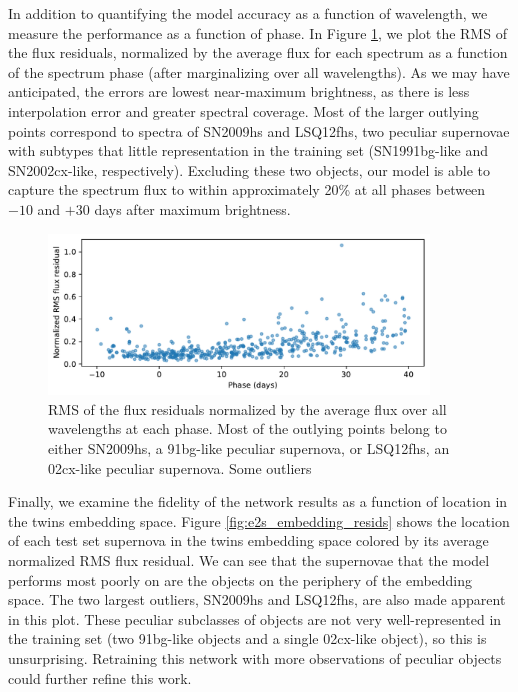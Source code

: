 In addition to quantifying the model accuracy as a function of wavelength, we measure the performance as a function of phase. In Figure \ref{fig:e2s_phase_resids}, we plot the RMS of the flux residuals, normalized by the average flux for each spectrum as a function of the spectrum phase (after marginalizing over all wavelengths). As we may have anticipated, the errors are lowest near-maximum brightness, as there is less interpolation error and greater spectral coverage. Most of the larger outlying points correspond to spectra of SN2009hs and LSQ12fhs, two peculiar supernovae with subtypes that little representation in the training set (SN1991bg-like and SN2002cx-like, respectively). Excluding these two objects, our model is able to capture the spectrum flux to within approximately 20\% at all phases between $-10$ and $+30$ days after maximum brightness.

\begin{figure}
    \centering
    \includegraphics[width=0.9\textwidth]{figures/nn_twins/embed2spec_rms_phase.pdf}
    \caption{RMS of the flux residuals normalized by the average flux over all wavelengths at each phase. Most of the outlying points belong to either SN2009hs, a 91bg-like peculiar supernova, or LSQ12fhs, an 02cx-like peculiar supernova. Some outliers}
    \label{fig:e2s_phase_resids}
\end{figure}

Finally, we examine the fidelity of the \etos{} network results as a function of location in the twins embedding space. Figure \ref{fig:e2s_embedding_resids} shows the location of each test set supernova in the twins embedding space colored by its average normalized RMS flux residual. We can see that the supernovae that the model performs most poorly on are the objects on the periphery of the embedding space. The two largest outliers, SN2009hs and LSQ12fhs, are also made apparent in this plot. These peculiar subclasses of objects are not very well-represented in the training set (two 91bg-like objects and a single 02cx-like object), so this is unsurprising. Retraining this network with more observations of peculiar objects could further refine this work.

